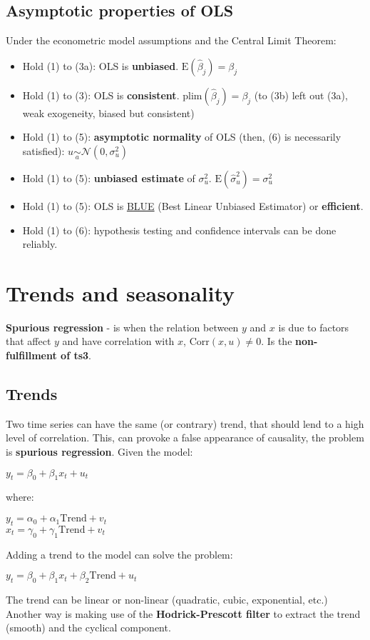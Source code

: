 \documentclass[10pt, a4paper, landscape]{extarticle}
\newcommand{\E}{\mathrm{E}}
\newcommand{\Corr}{\mathrm{Corr}}
\begin{document}
\begin{multicols}{3}
	\subsection*{Asymptotic properties of OLS}
		Under the econometric model assumptions and the Central Limit Theorem:
		\begin{itemize}[leftmargin=*]
			\item Hold (1) to (3a): OLS is \textbf{unbiased}. $\E(\hat{\beta}_j) = \beta_j$
			\item Hold (1) to (3): OLS is \textbf{consistent}. $\mathrm{plim}(\hat{\beta}_j) = \beta_j$ (to (3b) left out (3a), weak exogeneity, biased but consistent)
			\item Hold (1) to (5): \textbf{asymptotic normality} of OLS (then, (6) is necessarily satisfied): $u \underset{a}{\sim} \mathcal{N}(0,\sigma^2_u)$
			\item Hold (1) to (5): \textbf{unbiased estimate} of $\sigma^2_u$. $\E(\hat{\sigma}^2_u) = \sigma^2_u$
			\item Hold (1) to (5): OLS is \textcolor{blue}{\href{https://www.youtube.com/watch?v=68ugkg9RePc}{BLUE}} (Best Linear Unbiased Estimator) or \textbf{efficient}. 
			\item Hold (1) to (6): hypothesis testing and confidence intervals can be done reliably.
		\end{itemize}
\columnbreak
\section*{Trends and seasonality}
	\textbf{Spurious regression} - is when the relation between $y$ and $x$ is due to factors that affect $y$ and have correlation with $x$, $\Corr(x, u) \neq 0$. Is the \textbf{non-fulfillment of ts3}.
	\subsection*{Trends}
		Two time series can have the same (or contrary) trend, that should lend to a high level of correlation. This, can provoke a false appearance of causality, the problem is \textbf{spurious regression}. Given the model:
		\begin{center}
			$y_t = \beta_0 + \beta_1 x_t + u_t$
		\end{center}
		where:
		\begin{center}
			$y_t = \alpha_0 + \alpha_1 \mathrm{Trend} + v_t$ \\
			$x_t = \gamma_0 + \gamma_1 \mathrm{Trend} + v_t$
		\end{center}
		Adding a trend to the model can solve the problem:
		\begin{center}
			$y_t = \beta_0 + \beta_1 x_t + \beta_2 \mathrm{Trend} + u_t$
		\end{center}
		The trend can be linear or non-linear (quadratic, cubic, exponential, etc.) \\
		Another way is making use of the \textbf{Hodrick-Prescott filter} to extract the trend (smooth) and the cyclical component.

\end{multicols}
\end{document}
